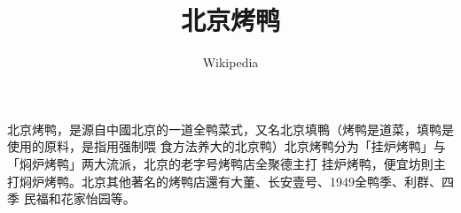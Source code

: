 \documentclass{article}
\title{北京烤鸭}
\author{Wikipedia}
\date{}
\begin{document}
\maketitle

北京烤鸭，是源自中國北京的一道全鸭菜式，又名北京填鴨（烤鸭是道菜，填鸭是使用的原料，是指用强制喂
食方法养大的北京鸭）北京烤鸭分为「挂炉烤鸭」与「焖炉烤鸭」两大流派，北京的老字号烤鸭店全聚德主打
挂炉烤鸭，便宜坊則主打焖炉烤鸭。北京其他著名的烤鸭店還有大董、长安壹号、1949全鸭季、利群、四季
民福和花家怡园等。 
\end{document}
